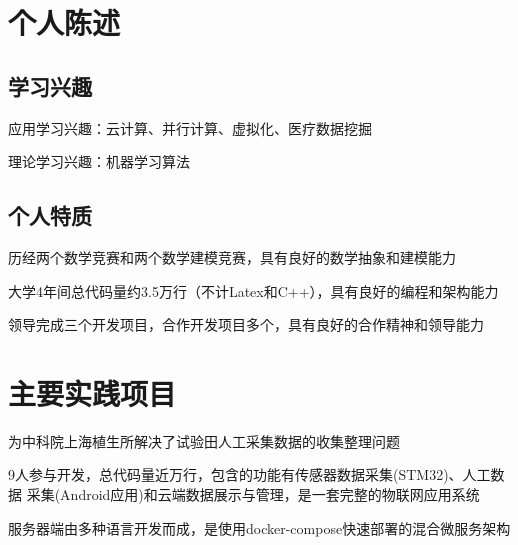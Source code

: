 \documentclass[]{deedy-resume-openfont}
\begin{document}
\hfill
\begin{minipage}[t]{0.73\textwidth}
    \section{个人陈述}
    \subsection{学习兴趣}
    \vspace{\topsep}
	\begin{tightemize}
		\item 应用学习兴趣：云计算、并行计算、虚拟化、医疗数据挖掘
		\item 理论学习兴趣：机器学习算法
	\end{tightemize}
    \subsection{个人特质}
    \vspace{\topsep}
    \begin{tightemize}
        \item 历经两个数学竞赛和两个数学建模竞赛，具有良好的数学抽象和建模能力
		\item 大学4年间总代码量约3.5万行（不计Latex和C++），具有良好的编程和架构能力
		\item 领导完成三个开发项目，合作开发项目多个，具有良好的合作精神和领导能力
	\end{tightemize}
    \sectionsep
	

    \section{主要实践项目}
	\begin{tightemize}
		\item 为中科院上海植生所解决了试验田人工采集数据的收集整理问题
		\item 9人参与开发，总代码量近万行，包含的功能有传感器数据采集(STM32)、人工数据 采集(Android应用)和云端数据展示与管理，是一套完整的物联网应用系统
		\item 服务器端由多种语言开发而成，是使用docker-compose快速部署的混合微服务架构
	\end{tightemize}
	\sectionsep
    

\end{minipage}
\end{document}
